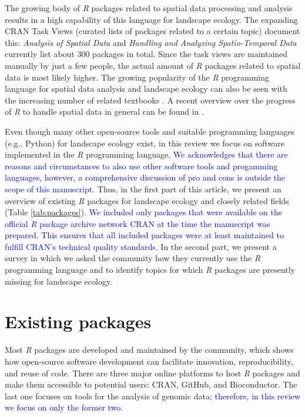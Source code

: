 \documentclass[smallextended]{svjour3}       %
\begin{document}
The growing body of \textit{R} packages related to spatial data processing and analysis results in a high capability of this language for landscape ecology.
The expanding CRAN Task Views (curated lists of packages related to a certain topic) document this: \textit{Analysis of Spatial Data} \cite{Bivand2019a} and \textit{Handling and Analyzing Spatio-Temporal Data} \cite{Pebesma2020} currently list about 300 packages in total.
Since the task views are maintained manually by just a few people, the actual amount of \textit{R} packages related to spatial data is most likely higher.
The growing popularity of the \textit{R} programming language for spatial data analysis and landscape ecology can also be seen with the increasing number of related textbooks \cite{Wegmann2016,Fletcher2018,Lovelace2019,Pebesma2019a}.
A recent overview over the progress of \textit{R} to handle spatial data in general can be found in \cite{Bivand2020}.

Even though many other open-source tools \cite{QGISDevelopmentTeam2016,GRASSDevelopmentTeam2017,Porta2017} and suitable programming languages (e.g., Python) for landscape ecology exist, in this review we focus on software implemented in the \textit{R} programming language.
\textcolor{blue}{We acknowledges that there are reasons and circumstances to also use other software tools and progamming languages, however, a comprehensive discussion of pro and cons is outside the scope of this manuscript.}
Thus, in the first part of this article, we present an overview of existing \textit{R} packages for landscape ecology and closely related fields (Table \ref{tab:packages}).
\textcolor{blue}{We included only packages that were available on the official \textit{R} package archive network CRAN at the time the manuscript was prepared. 
This ensures that all included packages were at least maintained to fulfill CRAN's technical quality standards.}
In the second part, we present a survey in which we asked the community how they currently use the \textit{R} programming language and to identify topics for which \textit{R} packages are presently missing for landscape ecology.

\hypertarget{sec:existing_packages}{%
\section{Existing packages}\label{sec:existing_packages}}

Most \textit{R} packages are developed and maintained by the community, which shows how open-source software development can facilitate innovation, reproducibility, and reuse of code.
There are three major online platforms to host \textit{R} packages and make them accessible to potential users: CRAN, GitHub, and Bioconductor.
The last one focuses on tools for the analysis of genomic data; \textcolor{blue}{therefore, in this review we focus on only the former two.}
\end{document}
